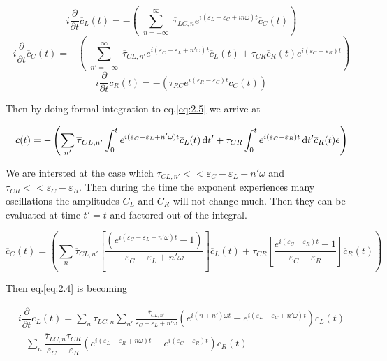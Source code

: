 \begin{equation} \label{eq:2.4}
i\dfrac{\partial}{\partial t} \overline{c}_L (t) = - \left( \sum_{\substack{n=-\infty}}^{\infty} \overline{\tau}_{LC,n} e^{i(\varepsilon_L - \varepsilon_C + in\omega )t } \overline{c}_C (t) \right)
\end{equation}
\begin{equation} \label{eq:2.5}
i\dfrac{\partial}{\partial t} \overline{c}_C (t) = - \left( \sum_{\substack{n'=-\infty}}^{\infty} \overline{\tau}_{CL,n'} e^{i(\varepsilon_C - \varepsilon_L + n'\omega) t } \overline{c}_L (t) +  {\tau}_{CR} \overline{c}_R(t) e^{i(\varepsilon_C - \varepsilon_R)t} \right)
\end{equation}
\begin{equation} \label{eq:2.6}
i\dfrac{\partial}{\partial t} \overline{c}_R (t) = - \left( {\tau}_{RC} e^{i(\varepsilon_R - \varepsilon_C )t} \overline{c}_C(t)  \right)
\end{equation}

Then by doing formal integration to eq.\ref{eq:2.5} we arrive at


\begin{equation} \label{eq:2.7}
c(t) = - \left( \sum_{n'}  \overline{\tau}_{CL,n'}  \int_0^t {e^{i(\varepsilon_C - \varepsilon_L + n'\omega) t } \overline{c}_L (t)}  \,\mathrm{d} t'+  {\tau}_{CR} \int_0^t e^{i(\varepsilon_C - \varepsilon_R)t} \,\mathrm{d} t' \overline{c}_R(t) e \right)
\end{equation}

We are intersted at the case which $\tau_{CL,n'} << \varepsilon_C-\varepsilon_L + n'\omega$ and $\tau_{CR} << \varepsilon_C-\varepsilon_R $. Then during the time the exponent experiences many oscillations the amplitudes $\overline{C}_L$ and $\overline{C}_R$ will not change much. Then they can be evaluated at time $t'=t$ and factored out of the integral. 

\begin{equation} \label{eq:2.8}
\overline{c}_C (t) = \left( \sum_{n} \overline{\tau}_{CL,n'} \left[ \dfrac{ ( e^{i(\varepsilon_C - \varepsilon_L + n'\omega) t } -1) }{ \varepsilon_C - \varepsilon_L + n'\omega } \right] \overline{c}_L (t) + {\tau}_{CR}   \left[  \dfrac{e^{i(\varepsilon_C - \varepsilon_R)t} - 1}{ \varepsilon_C - \varepsilon_R } \right] \overline{c}_R(t) \right)
\end{equation}

Then eq.\ref{eq:2.4} is becoming 

\begin{multline}
i\dfrac{\partial}{\partial t} \overline{c}_L (t)=  \sum_{n}  \overline{\tau}_{LC,n}  \sum_{n'} \frac{\overline{\tau}_{CL,n'} } { \varepsilon_C -\varepsilon_L + n' \omega } \left(  { e^{ i (n+n')\omega t } } - e^{i ( \varepsilon_L - \varepsilon_C + n'\omega ) t } \right) \overline{c}_L(t) 
\\
+ \sum_{n}  \dfrac{ \overline{\tau}_{LC,n}  \tau_{CR}}{ { \varepsilon_C - \varepsilon_R }  } \left(  e^{i ( \varepsilon_L - \varepsilon_R + n \omega )  t } - e^{i ( \varepsilon_C - \varepsilon_R )  t } \right) \overline{c}_R(t) 
\end{multline}

